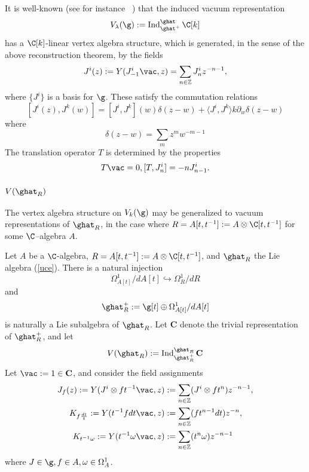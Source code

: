 \documentclass[12pt]{amsart}
\theoremstyle{definition}
\theoremstyle{remark}
\newcommand{\on}{\operatorname}
\newcommand{\R}{R}
\begin{document}
It is well-known (see for instance ~\cite{FBZ}) that the induced vacuum representation
\[
V_{\lambda}(\g) := \on{Ind}^{\ghat}_{\ghat^+} \C[k]
\] 
has a $\C[k]$-linear vertex algebra structure, which is generated, in the sense of the above reconstruction theorem, by the fields
\[
J^i (z) := Y(J^{i}_{-1} \vac, z) = \sum_{n \in \mathbb{Z}} J^i_n z^{-n-1},
\]
where $\{ J^{i} \}$ is a basis for $\g$. These satisfy the commutation relations
\[
[J^i(z), J^{k}(w)] = [J^{i}, J^{k}](w) \delta(z-w) +  \langle J^{i}, J^{k} \rangle k \partial_w \delta(z-w)
\]
where 
\[
\delta(z-w) = \sum_{m} z^{m} w^{-m-1} 
\]
The translation operator $T$ is determined by the properties
\[
T \vac =0, [T, J^i_n] = -n J^{i}_{n-1}.
\]


\subsubsection{$V(\ghat_{\R})$}

The vertex algebra structure on $V_{k}(\g)$ may be generalized to vacuum representations of $\ghat_{\R}$, in the case where $\R = A[t,t^{-1}] := A \otimes \C[t,t^{-1}]$ for some $\C$--algebra $A$. 


Let $A$ be a $\C$-algebra, $\R=A[t,t^{-1}] := A \otimes \C[t,t^{-1}]$, and $\ghat_{\R}$ the Lie algebra (\ref{uce}). 
There is a natural injection
\[
\Omega^1_{A[t]}/ d A[t] \hookrightarrow \Omega^{1}_{\R} / d \R
\]
and 
$$\ghat^{+}_{\R} := \g[t] \oplus \Omega^1_{A[t]}/ d A[t]  $$ is naturally a Lie subalgebra of $\ghat_{\R}$. Let $\mathbf{C}$ denote the trivial representation of $\ghat^{+}_{\R}$, and let
\begin{equation}
V(\ghat_{\R}) := \on{Ind}^{\ghat_{\R}}_{\ghat^+_{\R}} \mathbf{C}
\end{equation}
Let $\vac := 1 \in \mathbf{C}$, and consider the field assignments
\begin{align}
J_f(z) := Y(J^{i} \otimes f t^{-1} \vac,z ) & := \sum_{n \in \mathbb{Z}} (J^i  \otimes f t^{n}) z^{-n-1}, \\
K_{f \frac{dt}{t}} :=  Y(t^{-1} f dt \vac,z ) & := \sum_{n \in \mathbb{Z}} ( f t^{n-1} dt )  z^{-n}, \\
K_{t^{-1} \omega} := Y(t^{-1}  \omega \vac,z ) & := \sum_{n \in \mathbb{Z}}( t^{n} \omega )    z^{-n-1} \\
\end{align}
where $J\in \g, f \in A, \omega \in \Omega^{1}_A$. 
\end{document}
